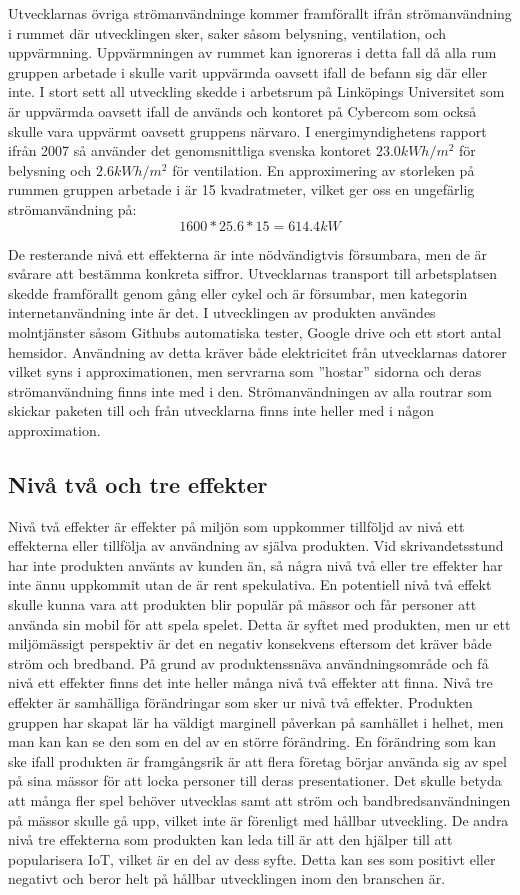 Utvecklarnas övriga strömanvändninge kommer framförallt ifrån strömanvändning i rummet där utvecklingen sker, saker såsom belysning, ventilation, och uppvärmning. Uppvärmningen av rummet kan ignoreras i detta fall då alla rum gruppen arbetade i skulle varit uppvärmda oavsett ifall de befann sig där eller inte. I stort sett all utveckling skedde i arbetsrum på Linköpings Universitet som är uppvärmda oavsett ifall de används och kontoret på Cybercom som också skulle vara uppvärmt oavsett gruppens närvaro. I energimyndighetens rapport ifrån 2007\cite{emynd} så använder det genomsnittliga svenska kontoret $23.0kWh/m^2$ för belysning och $2.6kWh/m^2$ för ventilation. En approximering av storleken på rummen gruppen arbetade i är 15 kvadratmeter, vilket ger oss en ungefärlig strömanvändning på: $$1600 * 25.6 * 15 = 614.4kW$$

De resterande nivå ett effekterna är inte nödvändigtvis försumbara, men de är svårare att bestämma konkreta siffror. Utvecklarnas transport till arbetsplatsen skedde framförallt genom gång eller cykel och är försumbar, men kategorin internetanvändning inte är det. I utvecklingen av produkten användes molntjänster såsom Githubs automatiska tester, Google drive och ett stort antal hemsidor. Användning av detta kräver både elektricitet från utvecklarnas datorer vilket syns i approximationen, men servrarna som ''hostar'' sidorna och deras strömanvändning  finns inte med i den. Strömanvändningen av alla routrar som skickar paketen till och från utvecklarna finns inte heller med i någon approximation.

\subsection{Nivå två och tre effekter}
Nivå två effekter är effekter på miljön som uppkommer tillföljd av nivå ett effekterna eller tillfölja av användning av själva produkten. Vid skrivandetsstund har inte produkten använts av kunden än, så några nivå två eller tre effekter har inte ännu uppkommit utan de är rent spekulativa. En potentiell nivå två effekt skulle kunna vara att produkten blir populär på mässor och får personer att använda sin mobil för att spela spelet. Detta är syftet med produkten, men ur ett miljömässigt perspektiv är det en negativ konsekvens eftersom det kräver både ström och bredband. På grund av produktenssnäva användningsområde och få nivå ett effekter finns det inte heller många nivå två effekter att finna. Nivå tre effekter är samhälliga förändringar som sker ur nivå två effekter. Produkten gruppen har skapat lär ha väldigt marginell påverkan på samhället i helhet, men man kan kan se den som en del av en större förändring. En förändring som kan ske ifall produkten är framgångsrik är att flera företag börjar använda sig av spel på sina mässor för att locka personer till deras presentationer. Det skulle betyda att många fler spel behöver utvecklas samt att ström och bandbredsanvändningen på mässor skulle gå upp, vilket inte är förenligt med hållbar utveckling. De andra nivå tre effekterna som produkten kan leda till är att den hjälper till att popularisera IoT, vilket är en del av dess syfte. Detta kan ses som positivt eller negativt och beror helt på hållbar utvecklingen inom den branschen är. 


